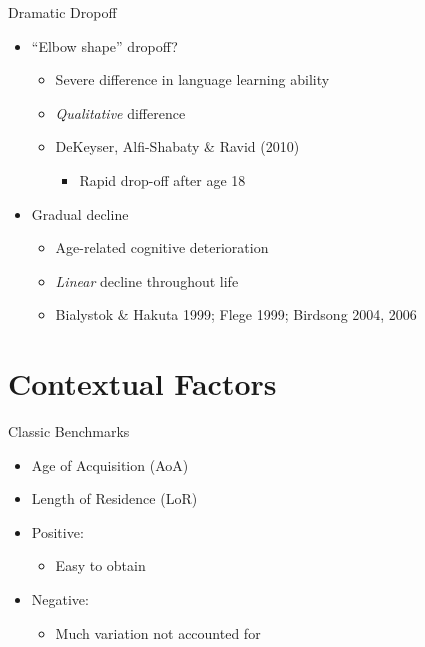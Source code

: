 \documentclass{beamer}
\begin{document}
\begin{frame}{Dramatic Dropoff}
  \begin{itemize}
    \item ``Elbow shape'' dropoff?
    \begin{itemize}
      \item Severe difference in language learning ability
      \item \emph{Qualitative} difference
      \item DeKeyser, Alfi-Shabaty \& Ravid (2010)
      \begin{itemize}
        \item Rapid drop-off after age 18
      \end{itemize}
    \end{itemize}
    \item Gradual decline
    \begin{itemize}
      \item Age-related cognitive deterioration
      \item \emph{Linear} decline throughout life
      \item Bialystok \& Hakuta 1999; Flege 1999; Birdsong 2004, 2006
    \end{itemize}
  \end{itemize}
\end{frame}


\section{Contextual Factors}

\begin{frame}{Classic Benchmarks} %
    \begin{itemize}
        \item Age of Acquisition (AoA)
        \item Length of Residence (LoR) \\
       \item Positive:
        \begin{itemize}
          \item Easy to obtain
        \end{itemize}
       \item Negative:
        \begin{itemize}
         \item Much variation not accounted for
        \end{itemize}
    \end{itemize}
\end{frame}
\end{document}
